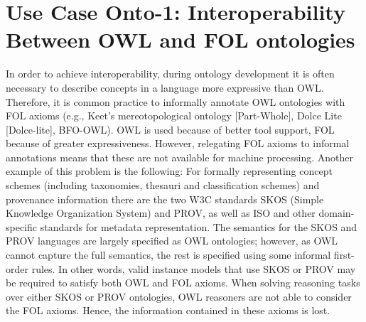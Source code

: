 \documentclass[10pt,fleqn,%
\ifpretendfinal
final%
\else
draft%
\fi,
]{scrreprt}
\begin{document}
%
%
%
%
%
%

\section{Use Case Onto-1: Interoperability Between OWL and FOL ontologies}

In order to achieve interoperability, during ontology development it is often necessary to describe 
concepts in a language more expressive than OWL.  Therefore, it is common practice to informally 
annotate OWL ontologies with FOL axioms (e.g., Keet's mereotopological ontology [Part-Whole], 
Dolce Lite [Dolce-lite], BFO-OWL). OWL is used because of better tool support, FOL because of 
greater expressiveness. However, relegating FOL axioms to  informal annotations means that these 
are not available for machine processing.  Another example of this problem is the following: For 
formally representing concept schemes (including taxonomies, thesauri and classification schemes) 
and provenance information there are the two W3C standards SKOS (Simple Knowledge Organization 
System) and PROV, as well as ISO and other domain-specific  standards for 
metadata representation. The semantics for the SKOS and PROV languages are largely specified as OWL 
ontologies; however, as OWL cannot capture the full semantics, the rest is specified using some 
informal first-order rules. In other words, valid instance models that use SKOS or PROV may be 
required to satisfy both OWL and FOL axioms. When solving reasoning tasks over either SKOS or PROV 
ontologies, OWL reasoners are not able to consider the  FOL axioms. Hence, the information 
contained in these axioms is lost.
\end{document}
